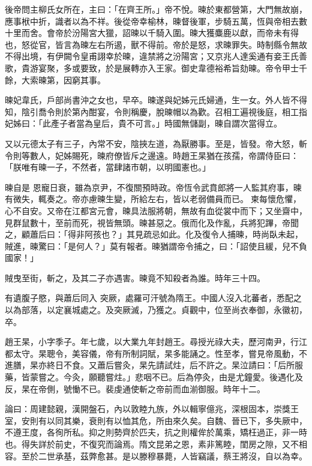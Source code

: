 \begin{pinyinscope}
 後帝問主柳氏女所在，主曰：「在齊王所。」帝不悅。暕於東都營第，大門無故崩，應事栿中折，識者以為不祥。後從帝幸榆林，暕督後軍，步騎五萬，恆與帝相去數十里而舍。會帝於汾陽宮大獵，詔暕以千騎入圍。暕大獲麋鹿以獻，而帝未有得也，怒從官，皆言為暕左右所遏，獸不得前。帝於是怒，求暕罪失。時制縣令無故不得出境，有伊闕令皇甫詡幸於暕，違禁將之汾陽宮；又京兆人達奚通有妾王氏善
 歌，貴游宴聚，多或要致，於是展轉亦入王家。御史韋德裕希旨劾暕。帝令甲士千餘，大索暕第，因窮其事。



 暕妃韋氏，戶部尚書沖之女也，早卒。暕遂與妃姊元氏婦通，生一女。外人皆不得知，陰引喬令則於第內酣宴，令則稱慶，脫暕帽以為歡。召相工遍視後庭，相工指妃姊曰：「此產子者當為皇后，貴不可言。」時國無儲副，暕自謂次當得立。



 又以元德太子有三子，內常不安，陰挾左道，為厭勝事。至是，皆發。帝大怒，斬令則等數人，妃姊賜死，暕府僚皆斥之邊遠。時趙王杲猶在孩孺，帝謂侍臣曰：「朕唯有暕一子，不然者，當肆諸市朝，以明國憲也。」



 暕自是
 恩寵日衰，雖為京尹，不復關預時政。帝恆令武賁郎將一人監其府事，暕有微失，輒奏之。帝亦慮暕生變，所給左右，皆以老弱備員而已。柬每懷危懼，心不自安。又帝在江都宮元會，暕具法服將朝，無故有血從裳中而下；又坐齋中，見群鼠數十，至前而死，視皆無頭。暕甚惡之。俄而化及作亂，兵將犯蹕，帝聞之，顧蕭后曰：「得非阿孩也？」其見疏忌如此。化及復令人捕暕，時尚臥未起，賊進，暕驚曰：「是何人？」莫有報者。暕猶謂帝令捕之，曰：「詔使且緩，兒不負國家！」



 賊曳至街，斬之，及其二子亦遇害。暕竟不知殺者為誰。時年三十四。



 有遺腹子愍，與蕭后同入
 突厥，處羅可汗號為隋王。中國人沒入北蕃者，悉配之以為部落，以定襄城處之。及突厥滅，乃獲之。貞觀中，位至尚衣奉御，永徽初，卒。



 趙王杲，小字季子。年七歲，以大業九年封趙王。尋授光祿大夫，歷河南尹，行江都太守。杲聰令，美容儀，帝有所制詞賦，杲多能誦之。性至孝，嘗見帝風動，不進膳，杲亦終日不食。又蕭后嘗灸，杲先請試炷，后不許之。杲泣請曰：「后所服藥，皆蒙嘗之。今灸，願聽嘗炷。」悲咽不已。后為停灸，由是尤鐘愛。後遇化及反，杲在帝側，號慟不已。裴虔通使斬之帝前而血湔御服。時年十二。



 論曰：周建懿親，漢開盤石，內以敦睦九族，外以輯寧億兆，深根固本，崇獎王室，安則有以同其樂，衰則有以恤其危，所由來久矣。自魏、晉已下，多失厥中，不遵王度，各徇所私。抑之則勢齊於匹夫，抗之則權侔於萬乘，矯枉過正，非一時也。得失詳於前史，不復究而論焉。隋文昆弟之恩，素非篤睦，閨房之隙，又不相容。至於二世承基，茲弊愈甚。是以滕穆暴薨，人皆竊議，蔡王將沒，自以為幸。




\end{pinyinscope}
